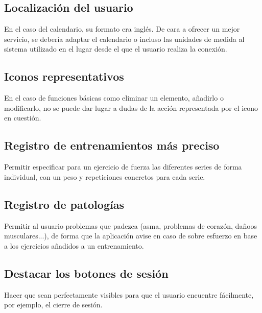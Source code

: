 \documentclass[a4paper]{article}
\begin{document}
	\subsection{Localización del usuario}
	
	En el caso del calendario, su formato era inglés. De cara a ofrecer un mejor servicio, se debería adaptar el calendario o incluso las unidades de medida al sistema utilizado en el lugar desde el que el usuario realiza la conexión.
	
	\subsection{Iconos representativos}
	
	En el caso de funciones básicas como eliminar un elemento, añadirlo o modificarlo, no se puede dar lugar a dudas de la acción representada por el icono en cuestión.
	
	\subsection{Registro de entrenamientos más preciso}
	
	Permitir especificar para un ejercicio de fuerza las diferentes series de forma individual, con un peso y repeticiones concretos para cada serie.
	
	\subsection{Registro de patologías}
	
	Permitir al usuario problemas que padezca (asma, problemas de corazón, dañoos musculares...), de forma que la aplicación avise en caso de sobre esfuerzo en base a los ejercicios añadidos a un entrenamiento.
	
	\subsection{Destacar los botones de sesión}
	
	Hacer que sean perfectamente visibles para que el usuario encuentre fácilmente, por ejemplo, el cierre de sesión.
\end{document}
